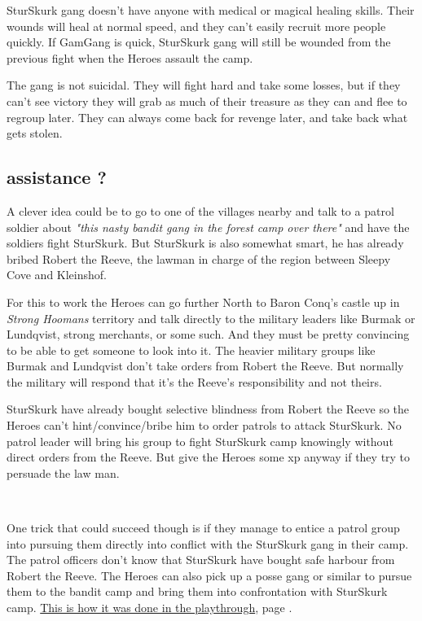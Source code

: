 SturSkurk gang doesn't have anyone with medical or magical healing skills. Their wounds will heal at normal speed, and they can't easily recruit more people quickly. If GamGang is quick, SturSkurk gang will still be wounded from the previous fight when the Heroes assault the camp. 

The gang is not suicidal. They will fight hard and take some losses, but if they can't see victory they will grab as much of their treasure as they can and flee to regroup later. They can always come back for revenge later, and take back what gets stolen.


\subsection*{assistance ?}

A clever idea could be to go to one of the villages nearby and talk to a patrol soldier about \emph{"this nasty bandit gang in the forest camp over there"} and have the soldiers fight SturSkurk. But SturSkurk is also somewhat smart, he has already bribed Robert the Reeve, the lawman in charge of the region between Sleepy Cove and Kleinshof.

For this to work the Heroes can go further North to Baron Conq's castle up in \emph{Strong Hoomans} territory and talk directly to the military leaders like Burmak or Lundqvist, strong merchants, or some such. And they must be pretty convincing to be able to get someone to look into it.
The heavier military groups like Burmak and Lundqvist don't take orders from Robert the Reeve. But normally the military will respond that it's the Reeve's responsibility and not theirs.

SturSkurk have already bought selective blindness from Robert the Reeve so the Heroes can't hint/convince/bribe him to order patrols to attack SturSkurk. No patrol leader will bring his group to fight SturSkurk camp knowingly without direct orders from the Reeve. But give the Heroes some xp anyway if they try to persuade the law man.

\

One trick that could succeed though is if they manage to entice a patrol group into pursuing them directly into conflict with the SturSkurk gang in their camp. The patrol officers don't know that SturSkurk have bought safe harbour from Robert the Reeve. The Heroes can also pick up a posse gang or similar to pursue them to the bandit camp and bring them into confrontation with SturSkurk camp. \hyperref[playthroughkillthebandits]{This is how it was done in the playthrough}, page \pageref{playthroughkillthebandits}.


